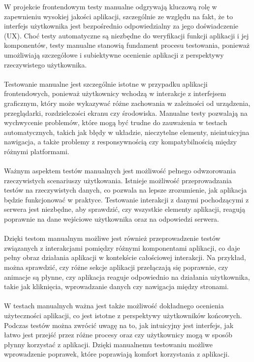 \documentclass[twoside]{projektInzynierskiMS1}
\begin{document}
\noindent
W projekcie frontendowym testy manualne odgrywają kluczową rolę w zapewnieniu wysokiej jakości aplikacji, szczególnie ze względu na fakt, że to interfejs użytkownika jest bezpośrednio odpowiedzialny za jego doświadczenie (UX). Choć testy automatyczne są niezbędne do weryfikacji funkcji aplikacji i jej komponentów, testy manualne stanowią fundament procesu testowania, ponieważ umożliwiają szczegółowe i subiektywne ocenienie aplikacji z perspektywy rzeczywistego użytkownika.
\\\\
Testowanie manualne jest szczególnie istotne w przypadku aplikacji frontendowych, ponieważ użytkownicy wchodzą w interakcje z interfejsem graficznym, który może wykazywać różne zachowania w zależności od urządzenia, przeglądarki, rozdzielczości ekranu czy środowiska. Manualne testy pozwalają na wychwycenie problemów, które mogą być trudne do zauważenia w testach automatycznych, takich jak błędy w układzie, nieczytelne elementy, nieintuicyjna nawigacja, a także problemy z responsywnością czy kompatybilnością między różnymi platformami.
\\\\
Ważnym aspektem testów manualnych jest możliwość pełnego odwzorowania rzeczywistych scenariuszy użytkowania. Istnieje możliwość przeprowadzania testów na rzeczywistych danych, co pozwala na lepsze zrozumienie, jak aplikacja będzie funkcjonować w praktyce. Testowanie interakcji z danymi pochodzącymi z serwera jest niezbędne, aby sprawdzić, czy wszystkie elementy aplikacji, reagują poprawnie na dane wejściowe użytkownika oraz na odpowiedzi serwera.
\\\\
Dzięki testom manualnym możliwe jest również przeprowadzenie testów związanych z interakcjami pomiędzy różnymi komponentami aplikacji, co daje pełny obraz działania aplikacji w kontekście całościowej interakcji. Na przykład, można sprawdzić, czy różne sekcje aplikacji przełączają się poprawnie, czy animacje są płynne, czy aplikacja reaguje odpowiednio na działania użytkownika, takie jak kliknięcia, wprowadzanie danych czy nawigacja między stronami.
\\\\
W testach manualnych ważna jest także możliwość dokładnego ocenienia użyteczności aplikacji, co jest istotne z perspektywy użytkowników końcowych. Podczas testów można zwrócić uwagę na to, jak intuicyjny jest interfejs, jak łatwo jest przejść przez różne procesy oraz czy użytkownicy mogą w sposób płynny korzystać z aplikacji. Dzięki manualnemu testowaniu możliwe wprowadzenie poprawek, które poprawiają komfort korzystania z aplikacji.
\end{document}
